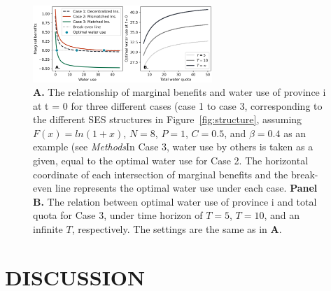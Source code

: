 \documentclass{../nsr}
\begin{document}
\begin{figure}[!ht]
    \centering
    \includegraphics[width=16pc]{outputs/economic_model.jpg}
	\caption{
		\textbf{A.} The relationship of marginal benefits and water use of province i at t = 0 for three different cases (case 1 to case 3, corresponding to the different SES structures in Figure~\ref{fig:structure}, assuming $F(x)=ln(1+x)$, $N=8$, $P=1$, $C=0.5$, and $\beta=0.4$ as an example  (see \textit{Methods}In Case 3, water use by others is taken as a given, equal to the optimal water use for Case 2. The horizontal coordinate of each intersection of marginal benefits and the break-even line represents the optimal water use under each case.
		\textbf{Panel B.} The relation between optimal water use of province i and total quota for Case 3, under time horizon of $T=5$, $T=10$, and an infinite $T$, respectively. The settings are the same as in \textbf{A}.
	}
	\label{fig:economic_model}
\end{figure}

\section{DISCUSSION}\label{discussion}

\end{document}
